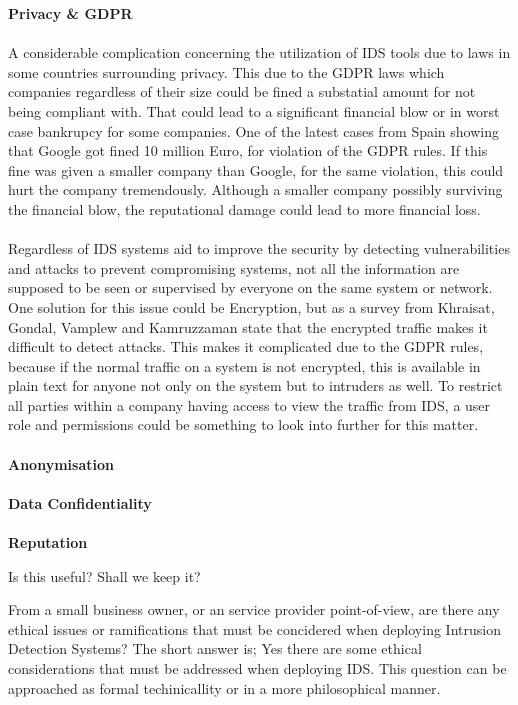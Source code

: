 \textbf{Privacy \& GDPR}\\
\\
A considerable complication concerning the utilization of IDS tools due to laws in some countries surrounding privacy. This due to the GDPR laws which companies regardless of their size could be fined a substatial amount for not being compliant with. That could lead to a significant financial blow or in worst case bankrupcy for some companies. One of the latest cases from Spain showing that Google got fined 10 million Euro, for violation of the GDPR rules.\cite{Enforcementtracker.com} If this fine was given a smaller company than Google, for the same violation, this could hurt the company tremendously. Although a smaller company possibly surviving the financial blow, the reputational damage could lead to more financial loss.\\
\\
Regardless of IDS systems aid to improve the security by detecting vulnerabilities and attacks to prevent compromising systems, not all the information are supposed to be seen or supervised by everyone on the same system or network. One solution for this issue could be Encryption, but as a survey from Khraisat, Gondal, Vamplew and Kamruzzaman state that the encrypted traffic makes it difficult to detect attacks. \cite{Khraisat2019} This makes it complicated due to the GDPR rules, because if the normal traffic on a system is not encrypted, this is available in plain text for anyone not only on the system but to intruders as well. To restrict all parties within a company having access to view the traffic from IDS, a user role and permissions could be something to look into further for this matter.\\
\\
\textbf{Anonymisation}\\
\\
\textbf{Data Confidentiality}\\
\\
\textbf{Reputation}\\

\begin{question}

    Is this useful? Shall we keep it?
    
\end{question}
    
    
From a small business owner, or an service provider point-of-view, are there any ethical issues or ramifications that must be concidered when deploying Intrusion Detection Systems? The short answer is; Yes there are some ethical considerations that must be addressed when deploying IDS. This question can be approached as formal techinicallity or in a more philosophical manner.

